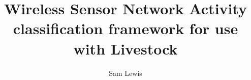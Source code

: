 \makeatletter
\title{Wireless Sensor Network Activity classification framework for use with Livestock} \let\Title\@title
\author{Sam Lewis} \let\Author\@author
{}  %
\makeatother


\renewcommand{\degreetext}{in partial fulfilment of the Degree Bachelor of Engineering  \\ in the discipline of Electrical Engineering}

\titlepage





\tableofcontents
\listoffigures
\listoftables

